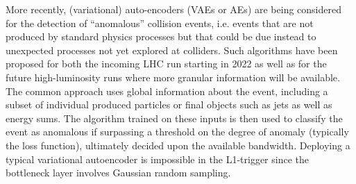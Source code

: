 
More recently, (variational) auto-encoders (VAEs or AEs) are being considered for the detection of ``anomalous'' collision events, i.e. events that are not produced by standard physics processes but that could be due instead to unexpected processes not yet explored at colliders. 
Such algorithms have been proposed for both the incoming LHC run starting in 2022 as well as for the future high-luminosity runs where more granular information will be available. 
The common approach uses global information about the event, including a subset of individual produced particles or final objects such as jets as well as energy sums. 
The algorithm trained on these inputs is then used to classify the event as anomalous if surpassing a threshold on the degree of anomaly (typically the loss function), ultimately decided upon the available bandwidth.
Deploying a typical variational autoencoder is impossible in the L1-trigger since the bottleneck layer involves Gaussian random sampling. 
